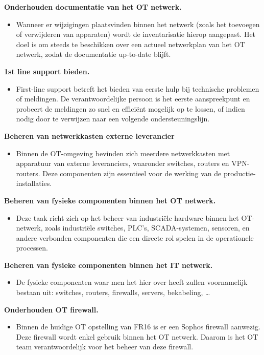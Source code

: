 \textbf{Onderhouden documentatie van het OT netwerk.}
\begin{itemize}[label=\textbullet]
    \item Wanneer er wijzigingen plaatsvinden binnen het netwerk (zoals het toevoegen of verwijderen van apparaten) wordt de inventarisatie hierop aangepast. Het doel is om steeds te beschikken over een actueel netwerkplan van het OT netwerk, zodat de documentatie up-to-date blijft. 
\end{itemize}

\textbf{1st line support bieden.}
\begin{itemize}[label=\textbullet]
    \item  First-line support betreft het bieden van eerste hulp bij technische problemen of meldingen. De verantwoordelijke persoon is het eerste aanspreekpunt en probeert de meldingen zo snel en efficiënt mogelijk op te lossen, of indien nodig door te verwijzen naar een volgende ondersteuningslijn.
\end{itemize}

\textbf{Beheren van netwerkkasten externe leverancier}
\begin{itemize}[label=\textbullet]
    \item Binnen de OT-omgeving bevinden zich meerdere netwerkkasten met apparatuur van externe leveranciers, waaronder switches, routers en VPN-routers. Deze componenten zijn essentieel voor de werking van de productie-installaties. 
\end{itemize}

\textbf{Beheren van fysieke componenten binnen het OT netwerk.}
\begin{itemize}[label=\textbullet]
    \item Deze taak richt zich op het beheer van industriële hardware binnen het OT-netwerk, zoals industriële switches, PLC’s, SCADA-systemen, sensoren, en andere verbonden componenten die een directe rol spelen in de operationele processen.
\end{itemize}


\textbf{Beheren van fysieke componenten binnen het IT netwerk.}
\begin{itemize}[label=\textbullet]
    \item De fysieke componenten waar men het hier over heeft zullen voornamelijk bestaan uit: switches, routers, firewalls, servers, bekabeling, …
\end{itemize}

\textbf{Onderhouden OT firewall.}
\begin{itemize}[label=\textbullet]
    \item Binnen de huidige OT opstelling van FR16 is er een Sophos firewall aanwezig. Deze firewall wordt enkel gebruik binnen het OT netwerk. Daarom is het OT team verantwoordelijk voor het beheer van deze firewall.
\end{itemize}



